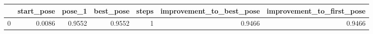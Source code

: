 \begin{tabular}{lrrrrrr}
\toprule
{} &  start\_pose &  pose\_1 &  best\_pose &  steps &  improvement\_to\_best\_pose &  improvement\_to\_first\_pose \\
\midrule
0 &      0.0086 &  0.9552 &     0.9552 &      1 &                    0.9466 &                     0.9466 \\
\bottomrule
\end{tabular}
